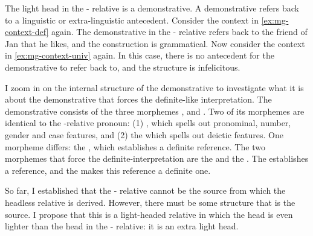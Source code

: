 The light head in the - relative is a demonstrative. A demonstrative refers back to a linguistic or extra-linguistic antecedent. Consider the context in \ref{ex:mg-context-def} again. The demonstrative  in the - relative refers back to the friend of Jan that he likes, and the construction is grammatical. Now consider the context in \ref{ex:mg-context-univ} again. In this case, there is no antecedent for the demonstrative  to refer back to, and the structure is infelicitous.

I zoom in on the internal structure of the demonstrative  to investigate what it is about the demonstrative that forces the definite-like interpretation. The demonstrative consists of the three morphemes ,  and . Two of its morphemes are identical to the -relative pronoun: (1) , which spells out pronominal, number, gender and case features, and (2) the  which spells out deictic features. One morpheme differs: the , which establishes a definite reference. The two morphemes that force the definite-interpretation are the  and the . The  establishes a reference, and the  makes this reference a definite one.

So far, I established that the - relative cannot be the source from which the headless relative is derived. However, there must be some structure that is the source. I propose that this is a light-headed relative in which the head is even lighter than the head in the - relative: it is an extra light head.

